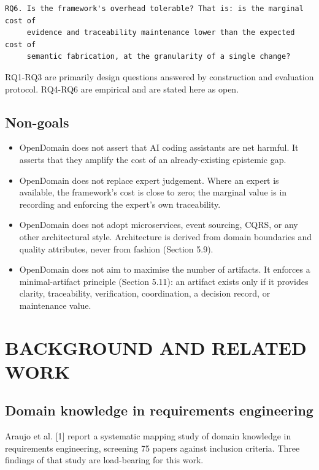 \documentclass[11pt,a4paper]{article}
\begin{document}
\begin{Verbatim}[fontsize=\footnotesize,breaklines=true,breakanywhere=true,breakautoindent=false,samepage=false]
RQ6. Is the framework's overhead tolerable? That is: is the marginal cost of
     evidence and traceability maintenance lower than the expected cost of
     semantic fabrication, at the granularity of a single change?
\end{Verbatim}

RQ1-RQ3 are primarily design questions answered by construction and evaluation protocol. RQ4-RQ6 are empirical and are stated here as open.

\subsection{Non-goals}

\begin{itemize}[leftmargin=*,nosep,topsep=2pt]
\item OpenDomain does not assert that AI coding assistants are net harmful. It   asserts that they amplify the cost of an already-existing epistemic gap.
\item OpenDomain does not replace expert judgement. Where an expert is available,   the framework's cost is close to zero; the marginal value is in recording   and enforcing the expert's own traceability.
\item OpenDomain does not adopt microservices, event sourcing, CQRS, or any other   architectural style. Architecture is derived from domain boundaries and   quality attributes, never from fashion (Section 5.9).
\item OpenDomain does not aim to maximise the number of artifacts. It enforces a   minimal-artifact principle (Section 5.11): an artifact exists only if it   provides clarity, traceability, verification, coordination, a decision   record, or maintenance value.
\end{itemize}

\section{BACKGROUND AND RELATED WORK}

\subsection{Domain knowledge in requirements engineering}

Araujo et al. [1] report a systematic mapping study of domain knowledge in requirements engineering, screening 75 papers against inclusion criteria. Three findings of that study are load-bearing for this work.
\end{document}
